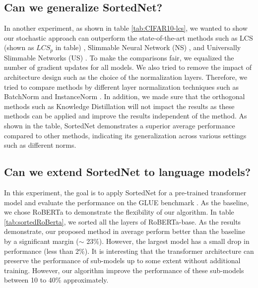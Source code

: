 \documentclass[letterpaper]{article} %
\begin{document}
\subsection{Can we generalize SortedNet?}


In another experiment, as shown in table \ref{tab:CIFAR10-lcs}, we wanted to show our stochastic approach can outperform the state-of-the-art methods such as LCS (shown as $LCS_p$ in table) \cite{Nunez_2023_WACV}, Slimmable Neural Network (NS) \cite{yu2018slimmable}, and Universally Slimmable Networks (US) \cite{yu2019universally}. To make the comparisons fair, we equalized the number of gradient updates for all models. %
We also tried to remove the impact of architecture design such as the choice of the normalization layers. Therefore, we tried to compare methods by different layer normalization techniques such as BatchNorm \cite{ioffe2015batch} and InstanceNorm \cite{ulyanov2016instance}. In addition, we made sure that the orthogonal methods such as Knowledge Distillation will not impact the results as these methods can be applied and improve the results independent of the method. As shown in the table, SortedNet demonstrates a superior average performance compared to other methods, indicating its generalization across various settings such as different norms.



\subsection{Can we extend SortedNet to language models?}

In this experiment, the goal is to apply SortedNet for a pre-trained transformer model and evaluate the performance on the GLUE benchmark \cite{wang2018glue}. As the baseline, we chose RoBERTa \cite{liu2019roberta} to demonstrate the flexibility of our algorithm. In table \ref{tab:sortedRoBerta}, we sorted all the layers of  RoBERTa-base. As the results demonstrate, our proposed method in average perform better than the baseline by a significant margin ($\sim$ 23\%). However, the largest model has a small drop in performance (less than 2\%). It is interesting that the transformer architecture can preserve the performance of sub-models up to some extent without additional training. However, our algorithm improve the performance of these sub-models between 10 to 40\% approximately.
\end{document}
